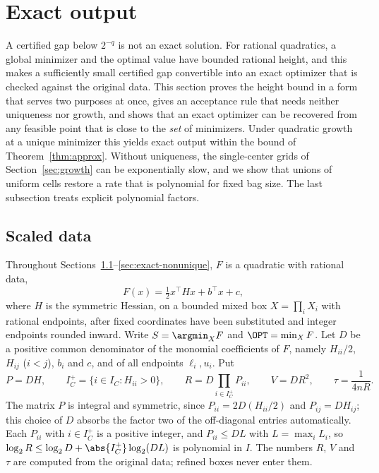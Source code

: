 
\section{Exact output}\label{sec:exact}

A certified gap below $2^{-q}$ is not an exact solution. For rational
quadratics, a global minimizer and the optimal value have bounded rational
height, and this makes a sufficiently small certified gap convertible into an
exact optimizer that is checked against the original data. This section
proves the height bound in a form that serves two purposes at once, gives an
acceptance rule that needs neither uniqueness nor growth, and shows that an
exact optimizer can be recovered from any feasible point that is close to the
\emph{set} of minimizers. Under quadratic growth at a unique minimizer this
yields exact output within the bound of Theorem~\ref{thm:approx}. Without
uniqueness, the single-center grids of Section~\ref{sec:growth} can be
exponentially slow, and we show that unions of uniform cells restore a rate
that is polynomial for fixed bag size. The last subsection treats explicit
polynomial factors.

\subsection{Scaled data}\label{sec:exact-data}

Throughout Sections~\ref{sec:exact-data}--\ref{sec:exact-nonunique}, $F$ is a
quadratic with rational data,
\[
F(x)=\tfrac12x^{\top}Hx+b^{\top}x+c ,
\]
where $H$ is the symmetric Hessian, on a bounded mixed box
$X=\prod_iX_i$ with rational endpoints, after fixed coordinates have been
substituted and integer endpoints rounded inward. Write
$S=\argmin_XF$ and $\OPT=\min_XF$. Let $D$ be a positive common denominator
of the monomial coefficients of $F$, namely $H_{ii}/2$, $H_{ij}$ ($i<j$),
$b_i$ and $c$, and of all endpoints $\ell_i,u_i$. Put
\begin{equation}\label{eq:exact-constants}
P=DH,\qquad I_C^+=\{i\in I_C:H_{ii}>0\},\qquad
R=D\prod_{i\in I_C^+}P_{ii},\qquad V=DR^2,\qquad \tau=\frac1{4nR}.
\end{equation}
The matrix $P$ is integral and symmetric, since $P_{ii}=2D(H_{ii}/2)$ and
$P_{ij}=DH_{ij}$; this choice of $D$ absorbs the factor two of the
off-diagonal entries automatically. Each $P_{ii}$ with $i\in I_C^+$ is a
positive integer, and $P_{ii}\le DL$ with $L=\max_iL_i$, so
$\log_2R\le\log_2D+\abs{I_C^+}\log_2(DL)$ is polynomial in $I$. The numbers
$R$, $V$ and $\tau$ are computed from the original data; refined boxes never
enter them.

